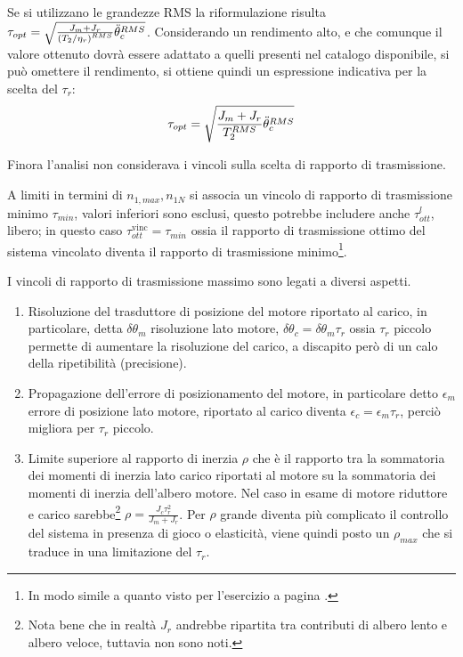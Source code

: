Se si utilizzano le grandezze RMS la riformulazione risulta \(\tau_{opt} = \sqrt{\frac{J_m + J_r}{\left(T_2/\eta_r\right)^{RMS}}\Ddot{\theta}_c^{RMS}}\). Considerando un rendimento alto, e che comunque il valore ottenuto dovrà essere adattato a quelli presenti nel catalogo disponibile, si può omettere il rendimento, si ottiene quindi un espressione indicativa per la scelta del \(\tau_r\):
\[\tau_{opt} = \sqrt{\frac{J_m + J_r}{T_2^{RMS}}\Ddot{\theta}_c^{RMS}}\] 

Finora l'analisi non considerava i vincoli sulla scelta di rapporto di trasmissione.

A limiti in termini di \(n_{1,max},n_{1N}\) si associa un vincolo di rapporto di trasmissione minimo \(\tau_{min}\), valori inferiori sono esclusi, questo potrebbe includere anche \(\tau_{ott}^l\), libero; in questo caso \(\tau^\text{vinc}_{ott} = \tau_{min}\) ossia il rapporto di trasmissione ottimo del sistema vincolato diventa il rapporto di trasmissione minimo\footnote{In modo simile a quanto visto per l'esercizio a pagina \pageref{EsercizioDimRid}.}.

I vincoli di rapporto di trasmissione massimo sono legati a diversi aspetti.

\begin{enumerate}
    \item Risoluzione del trasduttore di posizione del motore riportato al carico, in particolare, detta \(\delta \theta_m\) risoluzione lato motore, \(\delta \theta_c = \delta \theta_m \tau_r\) ossia \(\tau_r\) piccolo permette di aumentare la risoluzione del carico, a discapito però di un calo della ripetibilità (precisione).
    \item Propagazione dell'errore di posizionamento del motore, in particolare detto \(\epsilon_m\) errore di posizione lato motore, riportato al carico diventa \(\epsilon_c=\epsilon_m \tau_r\), perciò migliora per \(\tau_r\) piccolo.
    \item Limite superiore al rapporto di inerzia \(\rho \) che è il rapporto tra la sommatoria dei momenti di inerzia lato carico riportati al motore su la sommatoria dei momenti di inerzia dell'albero motore. Nel caso in esame di motore riduttore e carico sarebbe\footnote{Nota bene che in realtà \(J_r\) andrebbe ripartita tra contributi di albero lento e albero veloce, tuttavia non sono noti.} \(\rho=\frac{J_c \tau_r^2}{J_m+J_r}\).
    Per \(\rho\) grande diventa più complicato il controllo del sistema in presenza di gioco o elasticità, viene quindi posto un \(\rho_{max}\) che si traduce in una limitazione del \(\tau_r\).
\end{enumerate}

